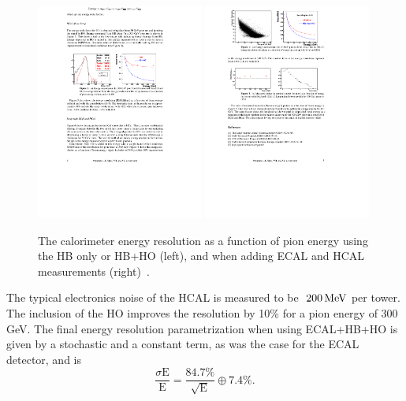 \begin{figure}[h!] 
    \centering
    \includegraphics[width=0.49\textwidth]{figures/cms/hcal_res.pdf}
    \includegraphics[width=0.49\textwidth]{figures/cms/hcal_ecal_res.pdf}
    \caption{The calorimeter energy resolution as a function of pion energy using the HB only or HB+HO (left), and when adding ECAL and HCAL measurements (right)~\cite{Sharma2007}.}
    \label{fig:cms:hcal-res}
\end{figure}
The typical electronics noise of the HCAL is measured to be $~200 \,\text{Me\hspace{-.08em}V}$ per tower. The inclusion of the HO improves the resolution by 10\% for a pion energy of 300 GeV. The final energy resolution parametrization when using ECAL+HB+HO is given by a stochastic and a constant term, as was the case for the ECAL detector, and is
\begin{equation*}
  \frac{\sigma \textrm{E}}{\textrm{E}} = \frac{84.7 \%}{\sqrt{\textrm{E}}}\oplus 7.4 \%.
\end{equation*}

